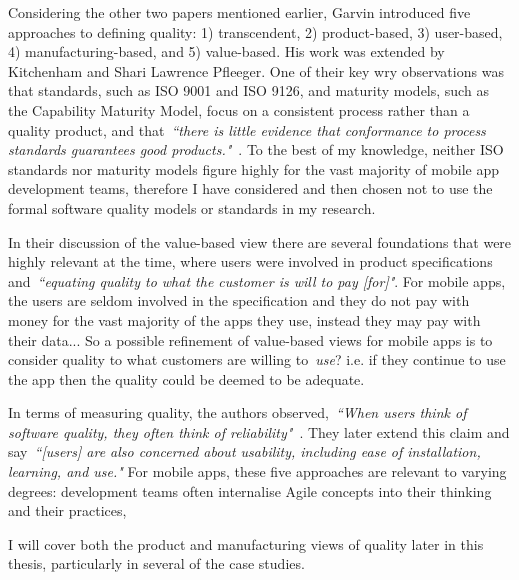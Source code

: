 Considering the other two papers mentioned earlier, Garvin introduced five approaches to defining quality: 1) transcendent, 2) product-based, 3) user-based, 4) manufacturing-based, and 5) value-based. His work was extended by Kitchenham and Shari Lawrence Pfleeger. One of their key wry observations was that standards, such as ISO 9001 and ISO 9126, and maturity models, such as the Capability Maturity Model, focus on a consistent process rather than a quality product, and that~\emph{``there is little evidence that conformance to process standards guarantees good products."}~. To the best of my knowledge, neither ISO standards nor maturity models figure highly for the vast majority of mobile app development teams, therefore I have considered and then chosen not to use the formal software quality models or standards in my research. 

In their discussion of the value-based view there are several foundations that were highly relevant at the time, where users were involved in product specifications and~\emph{``equating quality to what the customer is will to pay [for]"}. For mobile apps, the users are seldom involved in the specification and they do not pay with money for the vast majority of the apps they use, instead they may pay with their data... So a possible refinement of value-based views for mobile apps is to consider quality to what customers are willing to~\emph{use}? i.e. if they continue to use the app then the quality could be deemed to be adequate.

In terms of measuring quality, the authors observed,~\emph{``When users think of software quality, they often think of reliability"}~. They later extend this claim and say~\emph{``[users] are also concerned about usability, including ease of installation, learning, and use."}
%
For mobile apps, these five approaches are relevant to varying degrees: development teams often internalise Agile concepts into their thinking and their practices, %

I will cover both the product and manufacturing views of quality later in this thesis, particularly in several of the case studies.




